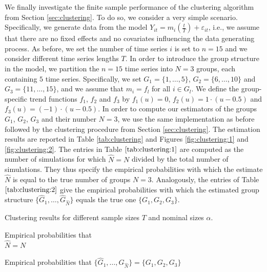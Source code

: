 \documentclass[a4paper,12pt]{article}
\begin{document}
We finally investigate the finite sample performance of the clustering algorithm from Section \ref{sec:clustering}. To do so, we consider a very simple scenario. Specifically, we generate data from the model $Y_{it} = m_i(\frac{t}{T}) + \varepsilon_{it}$, i.e., we assume that there are no fixed effects and no covariates influencing the data generating process. As before, we set the number of time series $i$ is set to $n = 15$ and we consider different time series lengths $T$. In order to introduce the group structure in the model, we partition the $n = 15$ time series into $N=3$ groups, each containing $5$ time series. Specifically, we set $G_1 = \{1,\ldots, 5\}$, $G_2 = \{6,\ldots, 10\}$ and $G_3 =  \{11,\ldots, 15\}$, and we assume that $m_i = f_l$ for all $i \in G_l$. We define the group-specific trend functions $f_1$, $f_2$ and $f_3$ by $f_1(u) = 0$, $f_2(u) = 1 \cdot (u - 0.5)$ and $f_3(u) =  (- 1) \cdot (u - 0.5)$. In order to compute our estimators of the groups $G_1$, $G_2$, $G_3$ and their number $N = 3$, we use the same implementation as before followed by the clustering procedure from Section \ref{sec:clustering}. The estimation results are reported in Table \ref{tab:clustering} and Figures \ref{fig:clustering:1} and \ref{fig:clustering:2}. The entries in Table $\ref{tab:clustering:1}$ are computed as the number of simulations for which $\widehat{N} = N$ divided by the total number of simulations. They thus specify the empirical probabilities with which the estimate $\widehat{N}$ is equal to the true number of groups $N = 3$. Analogously, the entries of Table $\ref{tab:clustering:2}$ give the empirical probabilities with which the estimated group structure $\{ \widehat{G}_1,\ldots,\widehat{G}_{\widehat{N}}\}$ equals the true one $\{G_1,G_2,G_3\}$. 

\addtocounter{table}{-1} 
\begin{table}[t]
\footnotesize{
\begin{center}
\caption{Clustering results for different sample sizes $T$ and nominal sizes $\alpha$.}\label{tab:clustering}
\begin{subtable}[b]{0.48\textwidth}
\centering
\caption{Empirical probabilities that \\ $\widehat{N} = N$}\label{tab:clustering:1}
\renewcommand{\arraystretch}{1.2}

\end{subtable}
\begin{subtable}[b]{0.48\textwidth}
\centering
\caption{\centering Empirical probabilities that $\{ \widehat{G}_1,\ldots,\widehat{G}_{\widehat{N}}\} = \{ G_1,G_2,G_3\}$}\label{tab:clustering:2}
\renewcommand{\arraystretch}{1.2}

\end{subtable}
\end{center}}
\vspace{-0.5cm}
\end{table}
\end{document}
